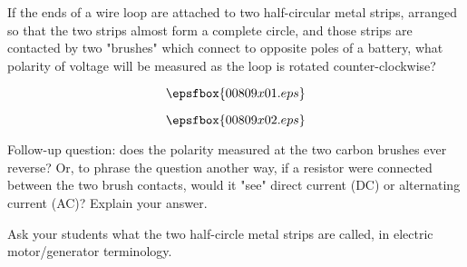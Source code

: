 

If the ends of a wire loop are attached to two half-circular metal strips, arranged so that the two strips almost form a complete circle, and those strips are contacted by two "brushes" which connect to opposite poles of a battery, what polarity of voltage will be measured as the loop is rotated counter-clockwise?

$$\epsfbox{00809x01.eps}$$







$$\epsfbox{00809x02.eps}$$

\vskip 10pt

Follow-up question: does the polarity measured at the two carbon brushes ever reverse?  Or, to phrase the question another way, if a resistor were connected between the two brush contacts, would it "see" direct current (DC) or alternating current (AC)?  Explain your answer.







Ask your students what the two half-circle metal strips are called, in electric motor/generator terminology.




